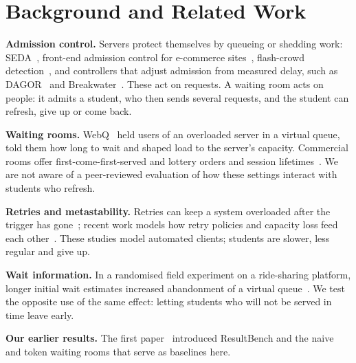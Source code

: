 \section{Background and Related Work}
\label{sec:background}

\textbf{Admission control.} Servers protect themselves by queueing or
shedding work: SEDA~\cite{welsh2001seda}, front-end admission control for
e-commerce sites~\cite{elnikety2004gatekeeper}, flash-crowd
detection~\cite{chen2005news}, and controllers that adjust admission from
measured delay, such as DAGOR~\cite{zhou2018dagor} and
Breakwater~\cite{cho2020breakwater}. These act on requests. A waiting room
acts on people: it admits a student, who then sends several requests, and the
student can refresh, give up or come back.

\textbf{Waiting rooms.} WebQ~\cite{doshi2015webq} held users of an overloaded
server in a virtual queue, told them how long to wait and shaped load to the
server's capacity. Commercial rooms offer first-come-first-served and lottery
orders and session lifetimes~\cite{cloudflare2026wr,aws2022vwr}. We are not
aware of a peer-reviewed evaluation of how these settings interact with
students who refresh. 

\textbf{Retries and metastability.} Retries can keep a system overloaded after
the trigger has gone~\cite{bronson2021metastable,huang2022metastable}; recent
work models how retry policies and capacity loss feed each
other~\cite{metastable2026characterizing,mehan2026retry}. These studies model
automated clients; students are slower, less regular and give up.

\textbf{Wait information.} In a randomised field experiment on a ride-sharing
platform, longer initial wait estimates increased abandonment of a virtual
queue~\cite{yu2023delayinfo}. We test the opposite use of the same effect:
letting students who will not be served in time leave early.

\textbf{Our earlier results.} The first paper~\cite{pathak2026surviving}
introduced ResultBench and the naive and token waiting rooms that serve as
baselines here.
